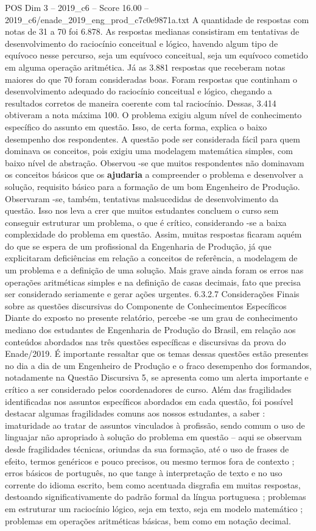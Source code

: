 \begin{textsample}{POS Dim 3 – 2019\_c6 – Score 16.00 – 2019\_c6/enade\_2019\_eng\_prod\_c7c0e9871a.txt}
A quantidade de respostas com notas de 31 a 70 foi 6.878.
As respostas medianas consistiram em tentativas de desenvolvimento do raciocínio conceitual e lógico, havendo algum tipo de equívoco nesse percurso, seja um equívoco conceitual, seja um equívoco cometido em alguma operação aritmética.
Já as 3.881 respostas que receberam notas maiores do que 70 foram consideradas boas.
Foram respostas que continham o desenvolvimento adequado do raciocínio conceitual e lógico, chegando a resultados corretos de maneira coerente com tal raciocínio.
Dessas, 3.414 obtiveram a nota máxima 100.
O problema exigiu algum nível de conhecimento específico do assunto em questão.
Isso, de certa forma, explica o baixo desempenho dos respondentes.
A questão pode ser considerada fácil para quem dominava os conceitos, pois exigiu uma modelagem matemática simples, com baixo nível de abstração.
Observou -se que muitos respondentes não dominavam os conceitos básicos que os \textbf{ajudaria} a compreender o problema e desenvolver a solução, requisito básico para a formação de um bom Engenheiro de Produção.
Observaram -se, também, tentativas malsucedidas de desenvolvimento da questão.
Isso nos leva a crer que muitos estudantes concluem o curso sem conseguir estruturar um problema, o que é crítico, considerando -se a baixa complexidade do problema em questão.
Assim, muitas respostas ficaram aquém do que se espera de um profissional da Engenharia de Produção, já que explicitaram deficiências em relação a conceitos de referência, a modelagem de um problema e a definição de uma solução.
Mais grave ainda foram os erros nas operações aritméticas simples e na definição de casas decimais, fato que precisa ser considerado seriamente e gerar ações urgentes. 6.3.2.7 Considerações Finais sobre as questões discursivas do Componente de Conhecimentos Específicos Diante do exposto no presente relatório, percebe -se um grau de conhecimento mediano dos estudantes de Engenharia de Produção do Brasil, em relação aos conteúdos abordados nas três questões específicas e discursivas da prova do Enade/2019.
É importante ressaltar que os temas dessas questões estão presentes no dia a dia de um Engenheiro de Produção e o fraco desempenho dos formandos, notadamente na Questão Discursiva 5, se apresenta como um alerta importante e crítico a ser considerado pelos coordenadores de curso.
Além das fragilidades identificadas nos assuntos específicos abordados em cada questão, foi possível destacar algumas fragilidades comuns aos nossos estudantes, a saber : imaturidade ao tratar de assuntos vinculados à profissão, sendo comum o uso de linguajar não apropriado à solução do problema em questão – aqui se observam desde fragilidades técnicas, oriundas da sua formação, até o uso de frases de efeito, termos genéricos e pouco precisos, ou mesmo termos fora de contexto ; erros básicos de português, no que tange à interpretação de texto e no uso corrente do idioma escrito, bem como acentuada disgrafia em muitas respostas, destoando significativamente do padrão formal da língua portuguesa ; problemas em estruturar um raciocínio lógico, seja em texto, seja em modelo matemático ; problemas em operações aritméticas básicas, bem como em notação decimal.

\end{textsample}
